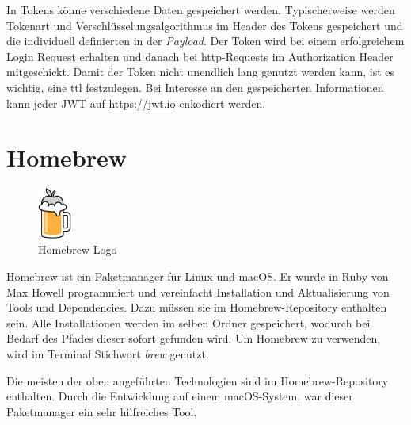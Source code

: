 In Tokens könne verschiedene Daten gespeichert werden. 
Typischerweise werden Tokenart und Verschlüsselungsalgorithmus im Header des Tokens gespeichert und die individuell definierten in der \emph{Payload}.
Der Token wird bei einem erfolgreichem Login Request erhalten und danach bei \gls{http}-Requests im Authorization Header mitgeschickt. 
Damit der Token nicht unendlich lang genutzt werden kann, ist es wichtig, eine \gls{ttl} festzulegen. 
Bei Interesse an den gespeicherten Informationen kann jeder JWT auf \href{https://jwt.io}{https://jwt.io} enkodiert werden.
\cite{JWTAbout}

\section{Homebrew}
\begin{figure}
  \begin{center}
      \includegraphics[width=0.1\textwidth]{pics/logos/brew.png}
      \caption{Homebrew Logo}
  \end{center}
\end{figure}
Homebrew ist ein Paketmanager für Linux und macOS. 
Er wurde in Ruby von Max Howell programmiert und vereinfacht Installation und Aktualisierung von Tools und Dependencies. 
Dazu müssen sie im Homebrew-Repository enthalten sein. 
Alle Installationen werden im selben Ordner gespeichert, wodurch bei Bedarf des Pfades dieser sofort gefunden wird. 
Um Homebrew zu verwenden, wird im Terminal Stichwort \emph{brew} genutzt. 

Die meisten der oben angeführten Technologien sind im Homebrew-Repository enthalten. 
Durch die Entwicklung auf einem macOS-System, war dieser Paketmanager ein sehr hilfreiches Tool. 
\cite{brewAbout}


